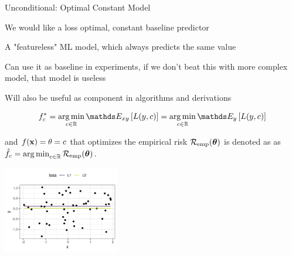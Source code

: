 \documentclass[11pt,compress,t,notes=noshow, xcolor=table]{beamer}
\begin{document}
\begin{vbframe}{Unconditional: Optimal Constant Model}

\begin{itemize}
{\footnotesize
\item We would like a loss optimal, constant baseline predictor
\item A "featureless" ML model, which always predicts the same value
\item Can use it as baseline in experiments, if we don't beat this
with more complex model, that model is useless
\item Will also be useful as component in algorithms and derivations
}
\end{itemize}



$$f_{c}^{\ast} = \argmin_{c \in \mathbb{R}} \E_{xy} \left[L(y,c)\right] = \argmin_{c \in \mathbb{R}} \E_{y} \left[L(y,c)\right]$$

{\footnotesize and $f(\mathbf{x}) = \theta = c$ that optimizes the empirical risk $\mathcal{R}_{\text{emp}}(\bm{\theta})$ is denoted as as $\hat{f}_c = \mathop{\mathrm{arg\,min}}_{c \in \mathbb{R}} \mathcal{R}_{\text{emp}}(\bm{\theta})$.}

\vspace*{-0.2cm}

\begin{center}
	\includegraphics[width = 0.38\textwidth]{figure/l1_vs_l2.png}
\end{center}
\end{vbframe}
\end{document}
